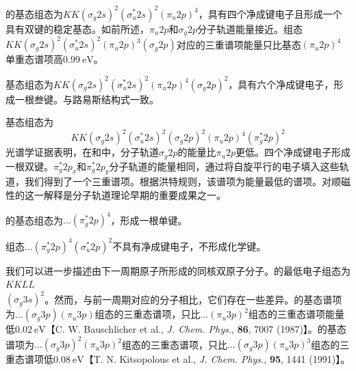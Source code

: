     的基态组态为$KK\left(\sigma_g2s\right)^2\left(\sigma_u^*2s\right)^2\left(\pi_u2p\right)^4$，具有四个净成键电子且形成一个具有双键的稳定基态。如前所述，$\pi_u2p$和$\sigma_g2p$分子轨道能量接近。组态$K K \left(\sigma_{g} 2 s\right)^{2} \left(\sigma_{u}^{*} 2 s\right)^{2} \left(\pi_{u} 2 p\right)^{3} \left(\sigma_{g} 2 p\right)$对应的三重谱项能量只比基态$\left(\pi_u2p\right)^4$单重态谱项高$0.99\:\mathrm{eV}$。

    基态组态为$KK\left(\sigma_g2s\right)^2\left(\sigma_u^*2s\right)^2\left(\pi_u2p\right)^4\left(\sigma_g2p\right)^2$，具有六个净成键电子，形成一根叁键。与路易斯结构式一致。

    基态组态为
    \begin{equation*}
        KK\left(\sigma_g2s\right)^2\left(\sigma_u^*2s\right)^2\left(\sigma_g2p\right)^2\left(\pi_u2p\right)^4\left(\pi_g^*2p\right)^2
    \end{equation*}
    光谱学证据表明，在和中，分子轨道$\sigma_g2p$的能量比$\pi_u2p$更低。四个净成键电子形成一根双键。$\pi_g^*2p_x$和$\pi_g^*2p_y$分子轨道的能量相同，通过将自旋平行的电子填入这些轨道，我们得到了一个三重谱项。根据洪特规则，该谱项为能量最低的谱项。对顺磁性的这一解释是分子轨道理论早期的重要成果之一。

    的基态组态为$\ldots\left(\pi_g^*2p\right)^4$，形成一根单键。

    组态$\ldots\left(\pi_g^*2p\right)^4\left(\sigma_u^*2p\right)^2$不具有净成键电子，不形成化学键。

    我们可以进一步描述由下一周期原子所形成的同核双原子分子。的最低电子组态为$KKLL$\\$\left(\sigma_g3s\right)^2$。然而，与前一周期对应的分子相比，它们存在一些差异。的基态谱项为$\ldots\left(\sigma_g3p\right)\left(\pi_u3p\right)$组态的三重态谱项，只比$\ldots\left(\pi_u3p\right)^2$组态的三重态谱项能量低$0.02\:\mathrm{eV}$【C. W. Bauschlicher et al., \textit{J. Chem. Phys.}, \textbf{86}, 7007 (1987)】。的基态谱项为$\ldots\left(\sigma_g3p\right)^2\left(\pi_u3p\right)^2$组态的三重态谱项，只比$\ldots\left(\sigma_g3p\right)\left(\pi_u3p\right)^3$组态的三重态谱项低$0.08\:\mathrm{eV}$【T. N. Kitsopolous et al., \textit{J. Chem. Phys.}, \textbf{95}, 1441 (1991)】。


